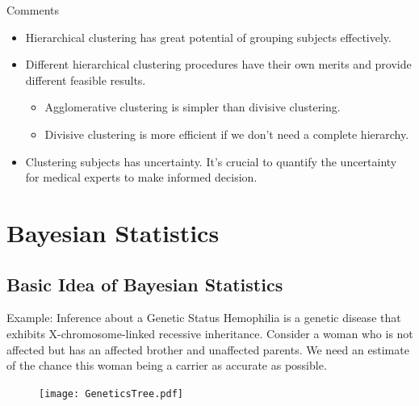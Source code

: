 \documentclass{beamer}
\begin{document}
	
	\begin{frame}{Comments}
		\begin{itemize}
			\item Hierarchical clustering has great potential of grouping subjects effectively.
			\item Different hierarchical clustering procedures have their own merits and provide different feasible results.
			\begin{itemize}
				\item Agglomerative clustering is simpler than divisive clustering.
				\item Divisive clustering is more efficient if we don't need a complete hierarchy.
			\end{itemize}
			\item Clustering subjects has uncertainty. It's crucial to quantify the uncertainty for medical experts to make informed decision.
		\end{itemize}
	\end{frame}
	
	\section{Bayesian Statistics}
	\subsection{Basic Idea of Bayesian Statistics}
		\begin{frame}
		\tableofcontents
		[
		currentsection,
		currentsubsection,
		subsectionstyle=show/shaded/hide
		]
	\end{frame}

	\begin{frame}{Example: Inference about a Genetic Status}
		Hemophilia is a genetic disease that exhibits X-chromosome-linked recessive inheritance. Consider a woman who is not affected but has an affected brother and unaffected parents. We need an estimate of the chance this woman being a carrier as accurate as possible.
		\begin{figure}[htbp]
			\centering
			\texttt{[image: GeneticsTree.pdf]}
		\end{figure}
	\end{frame}
\end{document}
